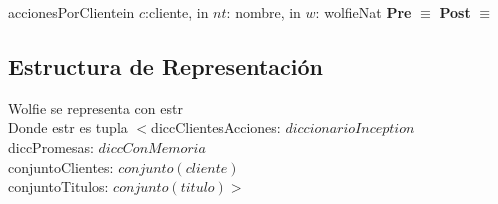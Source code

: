 	\begin{interfaz}{accionesPorCliente}{in $c$:cliente, in $nt$: nombre, in $w$: wolfie}{Nat}{}
	\textbf{Pre} $\equiv$ 
	\textbf{Post} $\equiv$ 
	\end{interfaz}

\subsection{Estructura de Representaci\'on}
	Wolfie se representa con estr\\
	
	Donde estr es tupla $<$diccClientesAcciones: $diccionarioInception$ \\
				     diccPromesas: $diccConMemoria$ \\
				     conjuntoClientes: $conjunto(cliente)$ \\
				     conjuntoTitulos: $conjunto(titulo)$$>$\\


